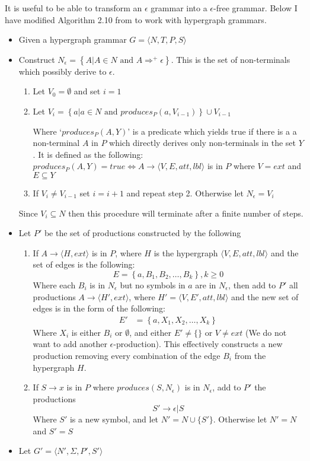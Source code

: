 It is useful to be able to transform an $\epsilon$ grammar into a $\epsilon$-free grammar. Below I have modified Algorithm 2.10 from \citet{Aho} to work with hypergraph grammars.

\begin{itemize}
\item Given a hypergraph grammar $G = \langle N, T, P, S \rangle$
\item Construct $N_\epsilon = \left\{A | A \in N \textrm{ and } A \Rightarrow^{+} \epsilon \right\}$. This is the set of non-terminals which possibly derive to $\epsilon$.

\begin{enumerate}
\item Let $V_0 = \emptyset$ and set $i = 1$
\item Let $V_i = \left\{a| a \in N \textrm{ and } produces_P(a, V_{i-1})\right\} \cup V_{i-1}$

Where `$produces_P(A, Y)$' is a predicate which yields true if there is a a non-terminal $A$ in $P$ which directly derives only non-terminals in the set $Y$. It is defined as the following: $produces_P(A, Y) = true \iff A \to \langle V, E, att, lbl\rangle$ is in $P$ where $V = ext$ and $E \subseteq Y$ 
\item If $V_i \neq V_{i-1}$ set $i=i+1$ and repeat step 2. Otherwise let $N_\epsilon = V_i$
\end{enumerate}
Since $V_i \subseteq N$ then this procedure will terminate after a finite number of steps.
\item Let $P'$ be the set of productions constructed by the following
\begin{enumerate}
\item If $A \to \langle H, ext \rangle$ is in $P$, where $H$ is the hypergraph $\langle V, E, att, lbl\rangle$ and the set of edges is the following:
\[E = \left\{ a, B_1, B_2, \dots, B_k\right\}, k \geq 0\]
Where each $B_i$ is in $N_\epsilon$ but no symbols in $a$ are in $N_\epsilon$, then add to $P'$ all productions $A \to \langle H', ext \rangle$, where $H' =  \langle V, E', att, lbl\rangle$ and the new set of edges is in the form of the following:
\begin{align*}
E' &= \left\{ a, X_1, X_2, \dots, X_k \right\}
\end{align*}
Where $X_i$ is either $B_i$ or $\emptyset$, and either $E' \neq \{\}$ or $V \neq ext$ (We do not want to add another $\epsilon$-production). This effectively constructs a new production removing every combination of the edge $B_i$ from the hypergraph $H$.
\item If $S \to x$ is in $P$ where $produces(S, N_\epsilon)$ is in $N_\epsilon$, add to $P'$ the productions
\[S' \to \epsilon|S\]
Where $S'$ is a new symbol, and let $N' = N \cup \{S'\}$. Otherwise let $N' = N$ and $S' = S$
\end{enumerate}
\item Let $G' = \langle N', \Sigma, P', S' \rangle$
\end{itemize}

